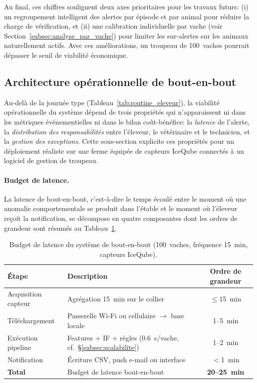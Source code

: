 Au final, ces chiffres soulignent deux axes prioritaires pour les travaux futurs:
(i) un regroupement intelligent des alertes par épisode et par animal pour réduire la
charge de vérification, et
(ii) une calibration individuelle par vache (voir Section~\ref{subsec:analyse_par_vache})
pour limiter les sur-alertes sur les animaux naturellement actifs. Avec ces améliorations,
un troupeau de 100~vaches pourrait dépasser le seuil de viabilité économique.

\FloatBarrier
\subsection{Architecture opérationnelle de bout-en-bout}
\label{subsec:workflow_ferme}

Au-delà de la journée type (Tableau~\ref{tab:routine_eleveur}), la viabilité
opérationnelle du système dépend de trois propriétés qui n'apparaissent ni
dans les métriques événementielles ni dans le bilan coût-bénéfice: la
\emph{latence} de l'alerte, la \emph{distribution des responsabilités}
entre l'éleveur, le vétérinaire et le technicien, et la \emph{gestion
des exceptions}. Cette sous-section explicite ces propriétés pour un
déploiement réaliste sur une ferme équipée de capteurs IceQube
connectés à un logiciel de gestion de troupeau.

\paragraph{Budget de latence.}
La latence de bout-en-bout, c'est-à-dire le temps écoulé entre le moment où une
anomalie comportementale se produit dans l'étable et le moment où
l'éleveur reçoit la notification, se décompose en quatre composantes
dont les ordres de grandeur sont résumés au
Tableau~\ref{tab:latence_budget}.

\begin{table}[H]
    \centering
    \small
    \caption{Budget de latence du système de bout-en-bout
    (100~vaches, fréquence 15~min, capteurs IceQube).}
    \label{tab:latence_budget}
    \begin{tabular}{lp{5.4cm}c}
        \toprule
        \textbf{Étape} & \textbf{Description} & \textbf{Ordre de grandeur} \\
        \midrule
        Acquisition capteur & Agrégation 15~min sur le collier
            & $\leq$15~min \\
        \addlinespace
        Téléchargement & Passerelle Wi-Fi ou cellulaire $\to$ base
            locale & 1--5~min \\
        \addlinespace
        Exécution pipeline & Features + IF + règles
            (0.6~s/vache, cf.~\S\ref{subsec:scalabilite})
            & 1--2~min \\
        \addlinespace
        Notification & Écriture CSV, push e-mail ou interface
            & $<$1~min \\
        \midrule
        \textbf{Total} & Budget de latence bout-en-bout
            & \textbf{20--25~min} \\
        \bottomrule
    \end{tabular}
\end{table}

